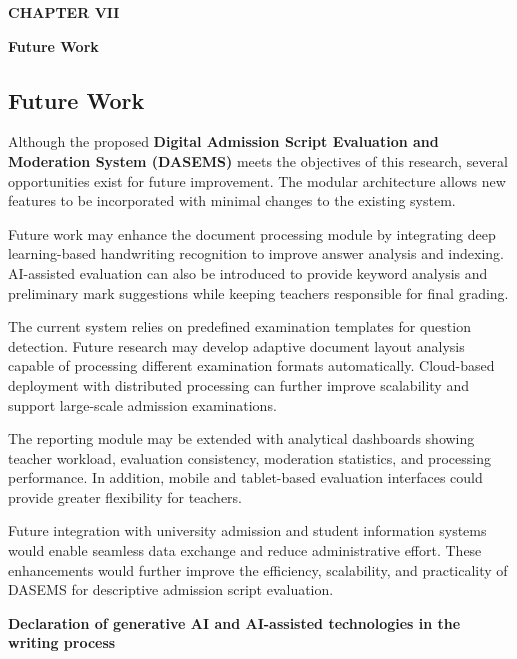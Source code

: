 \clearpage

\begin{center}
    \fontsize{14}{18}\selectfont \textbf{CHAPTER VII}

    \vspace{0.4cm}

    \fontsize{16}{20}\selectfont \textbf{Future Work}
\end{center}

\vspace{0.5cm}

\subsection{Future Work}

Although the proposed \textbf{Digital Admission Script Evaluation and Moderation System (DASEMS)} meets the objectives of this research, several opportunities exist for future improvement. The modular architecture allows new features to be incorporated with minimal changes to the existing system.

Future work may enhance the document processing module by integrating deep learning-based handwriting recognition to improve answer analysis and indexing. AI-assisted evaluation can also be introduced to provide keyword analysis and preliminary mark suggestions while keeping teachers responsible for final grading.

The current system relies on predefined examination templates for question detection. Future research may develop adaptive document layout analysis capable of processing different examination formats automatically. Cloud-based deployment with distributed processing can further improve scalability and support large-scale admission examinations.

The reporting module may be extended with analytical dashboards showing teacher workload, evaluation consistency, moderation statistics, and processing performance. In addition, mobile and tablet-based evaluation interfaces could provide greater flexibility for teachers.

Future integration with university admission and student information systems would enable seamless data exchange and reduce administrative effort. These enhancements would further improve the efficiency, scalability, and practicality of DASEMS for descriptive admission script evaluation.

\newpage

\textbf{Declaration of generative AI and AI-assisted technologies in the writing process}

